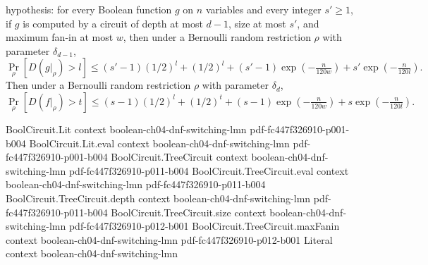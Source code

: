 \begin{lemma}
hypothesis: for every Boolean function $g$ on $n$ variables and every integer $s' \ge
1$, if $g$ is computed by a circuit of depth at most $d-1$, size at most $s'$, and
maximum fan-in at most $w$, then under a Bernoulli random restriction $\rho$ with
parameter $\delta_{d-1}$,
\[
\Pr_{\rho}\!\left[D(g|_\rho) > l\right] \le (s'-1)(1/2)^{l} + (1/2)^{l} +
(s'-1)\exp\!\left(-\tfrac{n}{120w}\right) + s'\exp\!\left(-\tfrac{n}{120l}\right).
\]
Then under a Bernoulli random restriction $\rho$ with parameter $\delta_{d}$,
\[
\Pr_{\rho}\!\left[D(f|_\rho) > t\right] \le (s-1)(1/2)^{l} + (1/2)^{t} +
(s-1)\exp\!\left(-\tfrac{n}{120w}\right) + s\exp\!\left(-\tfrac{n}{120l}\right).
\]
\end{lemma}

\begin{theorem}
\label{LMN.circuit_reduction_ind}
\leanok
{}
\proofstep
  {BoolCircuit.Lit}
  {context}
  {boolean-ch04-dnf-switching-lmn}
  {pdf-fc447f326910-p001-b004}
\proofstep
  {BoolCircuit.Lit.eval}
  {context}
  {boolean-ch04-dnf-switching-lmn}
  {pdf-fc447f326910-p001-b004}
\proofstep
  {BoolCircuit.TreeCircuit}
  {context}
  {boolean-ch04-dnf-switching-lmn}
  {pdf-fc447f326910-p011-b004}
\proofstep
  {BoolCircuit.TreeCircuit.eval}
  {context}
  {boolean-ch04-dnf-switching-lmn}
  {pdf-fc447f326910-p011-b004}
\proofstep
  {BoolCircuit.TreeCircuit.depth}
  {context}
  {boolean-ch04-dnf-switching-lmn}
  {pdf-fc447f326910-p011-b004}
\proofstep
  {BoolCircuit.TreeCircuit.size}
  {context}
  {boolean-ch04-dnf-switching-lmn}
  {pdf-fc447f326910-p012-b001}
\proofstep
  {BoolCircuit.TreeCircuit.maxFanin}
  {context}
  {boolean-ch04-dnf-switching-lmn}
  {pdf-fc447f326910-p012-b001}
\proofstep
  {Literal}
  {context}
  {boolean-ch04-dnf-switching-lmn}

\end{theorem}
